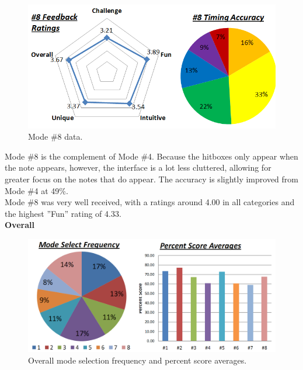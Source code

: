 \documentclass{sig-alternate}
\begin{document}
\begin{figure}[htb!]
	\begin{center}
		\includegraphics[width=1\linewidth]{figure_chart_8}
	\end{center}
	\vspace{-12pt}
	\caption{Mode \#8 data.}
	\label{fig:chart_8}
\end{figure}

Mode \#8 is the complement of Mode \#4. Because the hitboxes only appear when the note appears, however, the interface is a lot less cluttered, allowing for greater focus on the notes that do appear. The accuracy is slightly improved from Mode \#4 at 49\%. \\

Mode \#8 was very well received, with a ratings around 4.00 in all categories and the highest ''Fun'' rating of 4.33. \\

\newpage
\noindent \textbf{Overall}

\begin{figure}[htb!]
	\begin{center}
		\includegraphics[width=1\linewidth]{figure_chart_overall}
	\end{center}
	\vspace{-12pt}
	\caption{Overall mode selection frequency and percent score averages.}
	\label{fig:chart_overall}
\end{figure}
\end{document}
